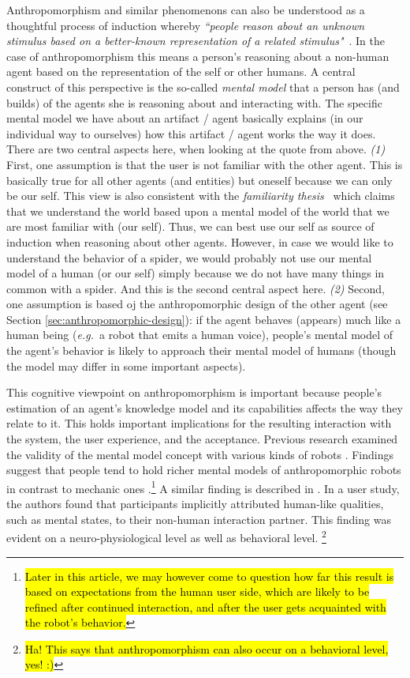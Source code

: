 \documentclass{frontiersSCNS} %
\newcommand{\eg}{{\textit{e.g.~}}}
\begin{document}
Anthropomorphism and similar phenomenons can also be understood as a thoughtful process of induction whereby \textit{``people reason about an unknown stimulus based on a better-known representation of a related stimulus"}~\citep{epley_when_2008}. In the case of anthropomorphism this means a person's reasoning about a non-human agent based on the representation of the self or other humans. A central construct of this perspective is the so-called \textit{mental model} that a person has (and builds) of the agents she is reasoning about and interacting with. The specific mental model we have about an artifact / agent basically explains (in our individual way to ourselves) how this artifact / agent works the way it does.
There are two central aspects here, when looking at the quote from \citep{epley_when_2008} above.
\textit{(1)} First, one assumption is that the user is not familiar with the other agent. This is basically true for all other agents (and entities) but oneself because we can only be our self. This view is also consistent with the \emph{familiarity thesis}~\citep{hegel_understanding_2008} which claims that we understand the world based upon a mental model of the world that we are most familiar with (our self). Thus, we can best use our self as source of induction when reasoning about other agents. However, in case we would like to understand the behavior of a spider, we would probably not use our mental model of a human (or our self) simply because we do not have many things in common with a spider. And this is the second central aspect here.
\textit{(2)} Second, one assumption is based oj the anthropomorphic design of the other agent (see Section \ref{sec:anthropomorphic-design}): if the agent behaves (appears) much like a human being (\eg a robot that emits a human voice), people's mental model of the agent's behavior is likely to approach their mental model of humans (though the model may differ in some important aspects).

This cognitive viewpoint on anthropomorphism is important because people's estimation of an agent's knowledge model and its capabilities affects the way they relate to it. This holds important implications for the resulting interaction with the system, the user experience, and the acceptance. Previous research examined the validity of the mental model concept with various kinds of robots \cite{schmitz_concepts_2011,kiesler_mental_2002}. Findings suggest that people tend to hold richer mental models of anthropomorphic robots in contrast to mechanic ones \cite{kiesler_mental_2002}.\footnote{\hl{Later in this article, we may however come to question how far this result is based on expectations from the human user side, which are likely to be refined after continued interaction, and after the user gets acquainted with the robot's behavior.}} A similar finding is described in \cite{hegel_understanding_2008}. In a user study, the authors found that participants implicitly attributed human-like qualities, such as mental states, to their non-human interaction partner. This finding was evident on a neuro-physiological level as well as behavioral level. \footnote{\hl{Ha! This says that anthropomorphism can also occur on a behavioral level, yes! :)}} 
\end{document}

